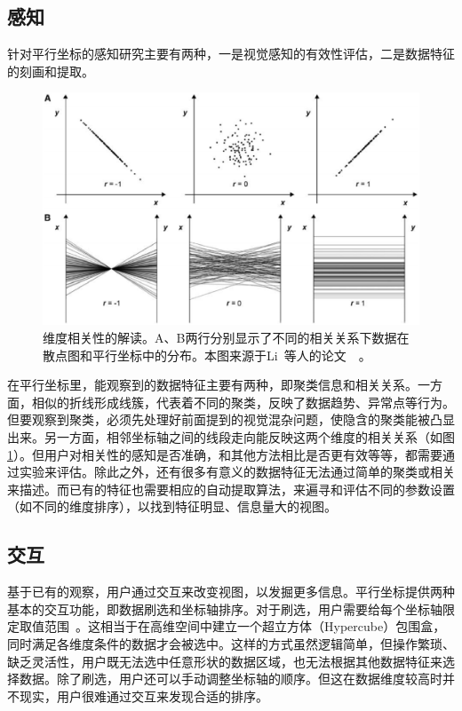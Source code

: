 \documentclass[12pt,twocolumn]{article}
\begin{document}
\subsection{感知}
\label{subsection:perceptionBasics}

针对平行坐标的感知研究主要有两种，一是视觉感知的有效性评估，二是数据特征的刻画和提取。

\begin{figure}[!htb]
\centering
\includegraphics[width=1.0\linewidth]{images/PC_correlation.eps}
\caption{\label{fig:PC_correlation}维度相关性的解读。A、B两行分别显示了不同的相关关系下数据在散点图和平行坐标中的分布。本图来源于Li~等人的论文~\citep{li2010judging}~。
}
\end{figure}

在平行坐标里，能观察到的数据特征主要有两种，即聚类信息和相关关系。一方面，相似的折线形成线簇，代表着不同的聚类，反映了数据趋势、异常点等行为。但要观察到聚类，必须先处理好前面提到的视觉混杂问题，使隐含的聚类能被凸显出来。另一方面，相邻坐标轴之间的线段走向能反映这两个维度的相关关系（如图\ref{fig:PC_correlation}）。但用户对相关性的感知是否准确，和其他方法相比是否更有效等等，都需要通过实验来评估。除此之外，还有很多有意义的数据特征无法通过简单的聚类或相关来描述。而已有的特征也需要相应的自动提取算法，来遍寻和评估不同的参数设置（如不同的维度排序），以找到特征明显、信息量大的视图。

\subsection{交互}
\label{subsection:interactionBasics}

基于已有的观察，用户通过交互来改变视图，以发掘更多信息。平行坐标提供两种基本的交互功能，即数据刷选和坐标轴排序。对于刷选，用户需要给每个坐标轴限定取值范围~\citep{martin1995high}。这相当于在高维空间中建立一个超立方体（Hypercube）包围盒，同时满足各维度条件的数据才会被选中。这样的方式虽然逻辑简单，但操作繁琐、缺乏灵活性，用户既无法选中任意形状的数据区域，也无法根据其他数据特征来选择数据。除了刷选，用户还可以手动调整坐标轴的顺序。但这在数据维度较高时并不现实，用户很难通过交互来发现合适的排序。
\end{document}
